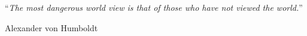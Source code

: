 
\vspace*{0.2\textheight}

\noindent\enquote{{\itshape The most dangerous world view is that of those who have not viewed the world.}}\bigbreak

\hfill Alexander von Humboldt
